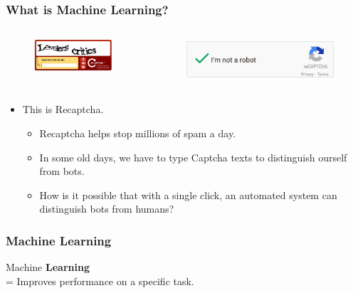 \documentclass[aspectratio=169]{beamer}
\begin{document}
\begin{frame}
	\frametitle{What is Machine Learning?}
	{
		\onslide<2->
		\begin{columns}
			\column{0.5\textwidth}
			\begin{figure}
				\includegraphics[scale=0.4]{imgs/old_recaptcha.png}
			\end{figure}
			\column{0.5\textwidth}
			\begin{figure}
				\includegraphics[scale=0.3]{imgs/recaptcha.png}
			\end{figure}
		\end{columns}
	}
	\begin{itemize}
		\item<3-> This is Recaptcha.
		      \begin{itemize}
			      \item<4-> Recaptcha helps stop millions of spam a day.
			      \item<5-> In some old days, we have to type Captcha texts to distinguish ourself from bots.
			      \item<6-> How is it possible that with a single click, an automated system can distinguish bots from humans?
		      \end{itemize}
	\end{itemize}
\end{frame}

\begin{frame}
	\frametitle{Machine Learning}
	\begin{center}
		Machine \textbf{Learning} \\
		 \huge = Improves performance on a specific task.
	\end{center}
\end{frame}
\end{document}
